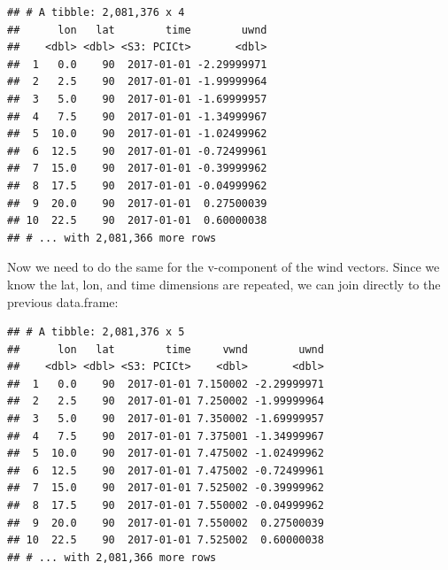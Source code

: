 \documentclass[]{book}
\newenvironment{Shaded}{\begin{snugshade}}{\end{snugshade}}
\newcommand{\KeywordTok}[1]{\textcolor[rgb]{0.13,0.29,0.53}{\textbf{{#1}}}}
\newcommand{\DataTypeTok}[1]{\textcolor[rgb]{0.13,0.29,0.53}{{#1}}}
\newcommand{\StringTok}[1]{\textcolor[rgb]{0.31,0.60,0.02}{{#1}}}
\newcommand{\OtherTok}[1]{\textcolor[rgb]{0.56,0.35,0.01}{{#1}}}
\newcommand{\NormalTok}[1]{{#1}}
\theoremstyle{definition}
\theoremstyle{definition}
\theoremstyle{remark}
\begin{document}
\begin{verbatim}
## # A tibble: 2,081,376 x 4
##      lon   lat        time        uwnd
##    <dbl> <dbl> <S3: PCICt>       <dbl>
##  1   0.0    90  2017-01-01 -2.29999971
##  2   2.5    90  2017-01-01 -1.99999964
##  3   5.0    90  2017-01-01 -1.69999957
##  4   7.5    90  2017-01-01 -1.34999967
##  5  10.0    90  2017-01-01 -1.02499962
##  6  12.5    90  2017-01-01 -0.72499961
##  7  15.0    90  2017-01-01 -0.39999962
##  8  17.5    90  2017-01-01 -0.04999962
##  9  20.0    90  2017-01-01  0.27500039
## 10  22.5    90  2017-01-01  0.60000038
## # ... with 2,081,366 more rows
\end{verbatim}

Now we need to do the same for the v-component of the wind vectors.
Since we know the lat, lon, and time dimensions are repeated, we can
join directly to the previous data.frame:

\begin{Shaded}
\end{Shaded}

\begin{verbatim}
## # A tibble: 2,081,376 x 5
##      lon   lat        time     vwnd        uwnd
##    <dbl> <dbl> <S3: PCICt>    <dbl>       <dbl>
##  1   0.0    90  2017-01-01 7.150002 -2.29999971
##  2   2.5    90  2017-01-01 7.250002 -1.99999964
##  3   5.0    90  2017-01-01 7.350002 -1.69999957
##  4   7.5    90  2017-01-01 7.375001 -1.34999967
##  5  10.0    90  2017-01-01 7.475002 -1.02499962
##  6  12.5    90  2017-01-01 7.475002 -0.72499961
##  7  15.0    90  2017-01-01 7.525002 -0.39999962
##  8  17.5    90  2017-01-01 7.550002 -0.04999962
##  9  20.0    90  2017-01-01 7.550002  0.27500039
## 10  22.5    90  2017-01-01 7.525002  0.60000038
## # ... with 2,081,366 more rows
\end{verbatim}
\end{document}
